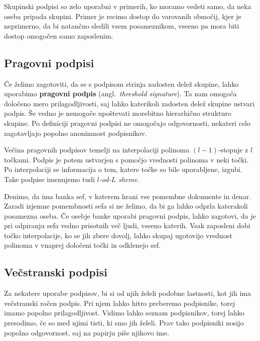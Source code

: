 \begin{primer}
    Skupinski podpisi so zelo uporabni v primerih, ko moramo vedeti samo, da neka oseba pripada skupini.
    Primer je recimo dostop do varovanih območij, kjer je neprimerno, da bi natančno sledili vsem
    posameznikom, vseeno pa mora biti dostop omogočen samo zaposlenim.
\end{primer}

\subsection{Pragovni podpisi}
Če želimo zagotoviti, da se s podpisom strinja zadosten delež skupine, lahko uporabimo \textbf{pragovni 
podpis} (angl.\ \textit{threshold signature}). Ta nam omogoča določeno mero prilagodljivosti, saj lahko 
katerikoli zadosten delež skupine ustvari podpis. Še vedno je nemogoče upoštevati morebitno hierarhično
strukturo skupine. Po definiciji pragovni podpisi ne omogočajo odgovornosti, nekateri celo
zagotavljajo popolno anonimnost podpisnikov.

Večina pragovnih podpisov temelji na interpolaciji polinoma $(l - 1)$-stopnje z $l$ točkami. Podpis je
potem ustvarjen s pomočjo vrednosti polinoma v neki točki. Po interpolaciji se informacija o tem,
katere točke so bile uporabljene, izgubi. Take podpise imenujemo tudi \textit{$l$-od-$L$ sheme}.

\begin{primer}
    Denimo, da ima banka sef, v katerem hrani vse pomembne dokumente in denar. Zaradi
    izjemne pomembnosti sefa si ne želimo, da bi ga lahko odprla katerakoli posamezna oseba. Če 
    osebje banke uporabi pragovni podpis, lahko zagotovi, da je pri odpiranju sefa vedno prisotnih
    več ljudi, vseeno katerih. Vsak zaposleni dobi točko interpolacije, ko se jih zbere dovolj,
    lahko skupaj ugotovijo vrednost polinoma v vnaprej določeni točki in odklenejo sef.
\end{primer}

\subsection{Večstranski podpisi}
\label{sec:multisig}
Za nekatere uporabe podpisov, bi si od njih želeli podobne lastnosti, kot jih ima večstranski ročen podpis. 
Pri njem lahko hitro preberemo podpisnike, torej imamo popolno prilagodljivost. Vidimo lahko seznam 
podpisnikov, torej lahko presodimo, če so med njimi tisti, ki smo jih želeli. Prav tako podpisniki nosijo 
popolno odgovornost, saj na papirju piše njihovo ime. 

